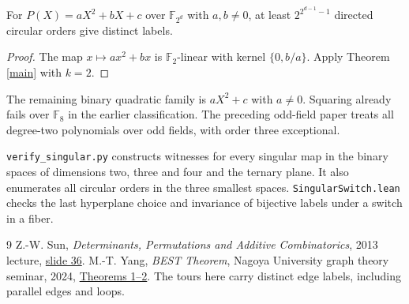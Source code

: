 \documentclass[11pt]{article}
\newcommand{\F}{\mathbb F}
\begin{document}
\begin{corollary}
For $P(X)=aX^2+bX+c$ over $\F_{2^d}$ with $a,b\ne0$, at least $2^{2^{d-1}-1}$ directed circular orders give distinct labels.
\end{corollary}
\begin{proof}
The map $x\mapsto ax^2+bx$ is $\F_2$-linear with kernel $\{0,b/a\}$. Apply Theorem \ref{main} with $k=2$.
\end{proof}
The remaining binary quadratic family is $aX^2+c$ with $a\ne0$. Squaring already fails over $\F_8$ in the earlier classification. The preceding odd-field paper treats all degree-two polynomials over odd fields, with order three exceptional.

\texttt{verify\_singular.py} constructs witnesses for every singular map in the binary spaces of dimensions two, three and four and the ternary plane. It also enumerates all circular orders in the three smallest spaces. \texttt{SingularSwitch.lean} checks the last hyperplane choice and invariance of bijective labels under a switch in a fiber.
\begin{thebibliography}{9}
 Z.-W. Sun, \emph{Determinants, Permutations and Additive Combinatorics}, 2013 lecture, \href{https://www.mathnet.ru/PresentFiles/21090/sun.pdf}{slide 36}.
 M.-T. Yang, \emph{BEST Theorem}, Nagoya University graph theory seminar, 2024, \href{https://www.math.nagoya-u.ac.jp/~richard/teaching/s2024/SML_Yang_1.pdf}{Theorems 1--2}. The tours here carry distinct edge labels, including parallel edges and loops.
\end{thebibliography}
\end{document}
